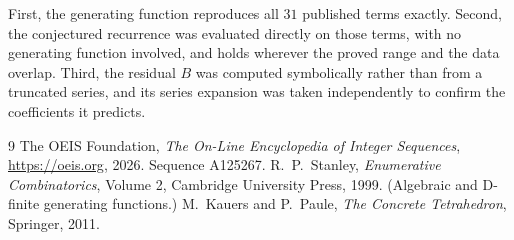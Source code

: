 \documentclass[11pt,a4paper]{article}
\theoremstyle{plain}
\theoremstyle{definition}
\begin{document}
First, the generating function reproduces all $31$ published terms exactly. Second,
the conjectured recurrence was evaluated directly on those terms, with no generating function
involved, and holds wherever the proved range and the data overlap. Third, the residual $B$ was
computed symbolically rather than from a truncated series, and its series expansion was taken
independently to confirm the coefficients it predicts.

\begin{thebibliography}{9}
 The OEIS Foundation, \emph{The On-Line Encyclopedia of Integer Sequences},
\url{https://oeis.org}, 2026. Sequence A125267.
 R.~P.~Stanley, \emph{Enumerative Combinatorics}, Volume 2, Cambridge
University Press, 1999. (Algebraic and D-finite generating functions.)
 M.~Kauers and P.~Paule, \emph{The Concrete Tetrahedron}, Springer, 2011.
\end{thebibliography}
\end{document}
